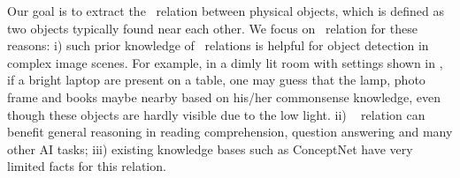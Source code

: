 Our goal is to extract the \lnear\ relation between
physical objects, which is defined as two objects typically found near each
other.
We focus on \lnear\ relation for these reasons: 
i) such prior knowledge of \lnear\ relations is helpful for 
object detection in complex image 
scenes. 
For example, in a dimly lit room with settings shown in , if a bright laptop are present on a table,
one may guess that the lamp, photo frame and books maybe nearby based on his/her commonsense knowledge, 
even though these objects are hardly visible due to the low light. 
ii) \lnear~ relation can benefit general reasoning in reading comprehension,
question answering and many other AI tasks;
iii) existing knowledge bases such as ConceptNet have very limited facts for
this relation.

%
%
%
%

